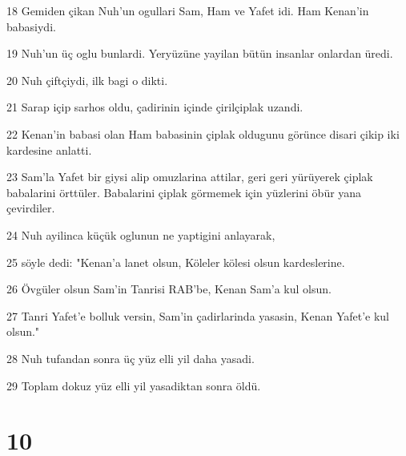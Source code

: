 \par 18 Gemiden çikan Nuh'un ogullari Sam, Ham ve Yafet idi. Ham Kenan'in babasiydi.
\par 19 Nuh'un üç oglu bunlardi. Yeryüzüne yayilan bütün insanlar onlardan üredi.
\par 20 Nuh çiftçiydi, ilk bagi o dikti.
\par 21 Sarap içip sarhos oldu, çadirinin içinde çirilçiplak uzandi.
\par 22 Kenan'in babasi olan Ham babasinin çiplak oldugunu görünce disari çikip iki kardesine anlatti.
\par 23 Sam'la Yafet bir giysi alip omuzlarina attilar, geri geri yürüyerek çiplak babalarini örttüler. Babalarini çiplak görmemek için yüzlerini öbür yana çevirdiler.
\par 24 Nuh ayilinca küçük oglunun ne yaptigini anlayarak,
\par 25 söyle dedi: "Kenan'a lanet olsun, Köleler kölesi olsun kardeslerine.
\par 26 Övgüler olsun Sam'in Tanrisi RAB'be, Kenan Sam'a kul olsun.
\par 27 Tanri Yafet'e bolluk versin, Sam'in çadirlarinda yasasin, Kenan Yafet'e kul olsun."
\par 28 Nuh tufandan sonra üç yüz elli yil daha yasadi.
\par 29 Toplam dokuz yüz elli yil yasadiktan sonra öldü.

\chapter{10}

